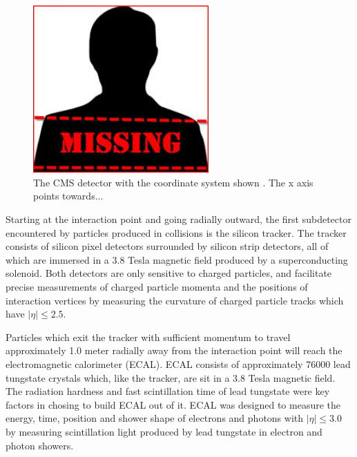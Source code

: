 \begin{figure}[h]
	\centering
	\includegraphics[width=0.6\textwidth]{figures/missingImage.png}
	\caption{The CMS detector with the coordinate system shown   .  The x axis points towards...}
	\label{fig:cmsDetectorComponentView}
\end{figure}


Starting at the interaction point and going radially outward, the first subdetector encountered by particles produced in collisions is the silicon tracker.
The tracker consists of silicon pixel detectors surrounded by silicon strip detectors, all of which are immersed in a 3.8 Tesla magnetic field produced by a superconducting solenoid.
Both detectors are only sensitive to charged particles, and facilitate precise measurements of charged particle momenta
and the positions of interaction vertices by measuring the curvature of charged particle tracks which have $|\eta| \leq 2.5$.

Particles which exit the tracker with sufficient momentum to travel approximately 1.0 meter radially away from the interaction point will reach the
electromagnetic calorimeter (ECAL).  ECAL consists of approximately 76000 lead tungstate crystals which, like the tracker, are sit in a 3.8 Tesla
magnetic field.  The radiation hardness and fast scintillation time of lead tungstate were key factors in chosing to build ECAL out of it.
ECAL was designed to measure the energy, time, position and shower shape of electrons and photons with $|\eta| \leq 3.0$ by measuring scintillation
light produced by lead tungstate in electron and photon showers.

